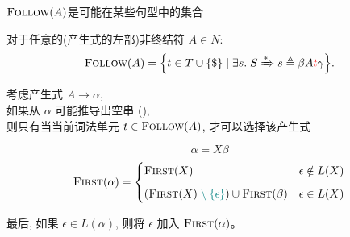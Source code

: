 \begin{frame}{}
  \begin{center}

    \vspace{0.60cm}
    $\follow(A)$是可能在某些句型中的集合
    \begin{definition}[$\follow(A)$集合]
        对于任意的(产生式的左部)非终结符 $A \in N:$
        \[
          \textsc{Follow}(A) = \Big\{t \in T \cup \{\$\}
            \mid \exists s.\; S \xRightarrow[]{\ast} s \triangleq \beta A\textcolor{red}{t} \gamma\Big\}.
        \]
    \end{definition}

    \pause
    \vspace{0.60cm}
    考虑产生式 $A \to \alpha$, \\[4pt]
    如果从 $\alpha$ 可能推导出空串 (\red{$\alpha \dstar \epsilon$}), \\[4pt]
    则只有当当前词法单元 $t \in \textsc{Follow}(A)$, 才可以选择该产生式
  \end{center}
\end{frame}

\begin{frame}{}
  \begin{center}

    

    \pause
  \end{center}
\end{frame}

\begin{frame}{}
  \begin{center}

    \[
      \alpha = X \beta
    \]
    \[
      \textsc{First}(\alpha) =
      \begin{cases}
        \textsc{First}(X) & \epsilon \notin L(X) \\[6pt]
        (\textsc{First}(X) \;\textcolor{teal}{\setminus\; \{\epsilon\}}) \cup \textsc{First}(\beta) & \epsilon \in L(X)
      \end{cases}
    \]

    \vspace{0.60cm}
    最后, 如果 $\epsilon \in L(\alpha)$, 则将 $\epsilon$ 加入 $\textsc{First}(\alpha)$。
  \end{center}
\end{frame}

